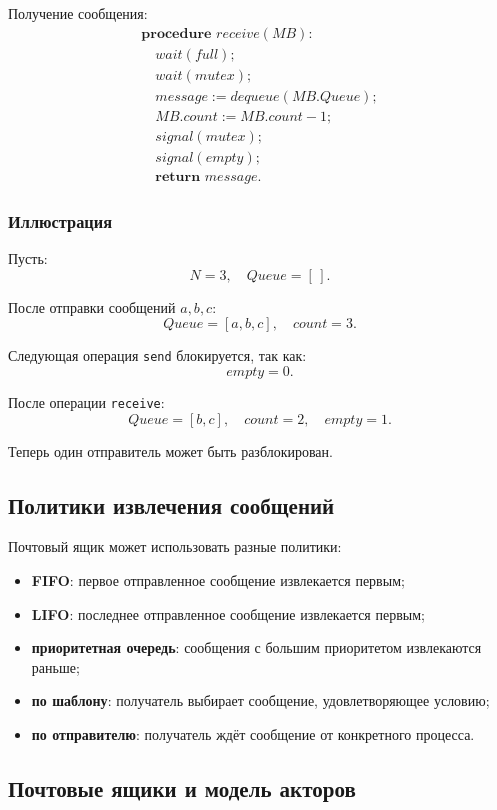 \documentclass[12pt,a4paper]{article}
\begin{document}
Получение сообщения:
\[
\begin{array}{l}
\textbf{procedure } receive(MB):\\
\quad wait(full);\\
\quad wait(mutex);\\
\quad message := dequeue(MB.Queue);\\
\quad MB.count := MB.count - 1;\\
\quad signal(mutex);\\
\quad signal(empty);\\
\quad \textbf{return } message.
\end{array}
\]

\subsubsection{Иллюстрация}

Пусть:
\[
N = 3,
\quad
Queue = [\,].
\]

После отправки сообщений $a,b,c$:
\[
Queue = [a,b,c],
\quad
count = 3.
\]

Следующая операция \texttt{send} блокируется, так как:
\[
empty = 0.
\]

После операции \texttt{receive}:
\[
Queue = [b,c],
\quad
count = 2,
\quad
empty = 1.
\]

Теперь один отправитель может быть разблокирован.

\subsection{Политики извлечения сообщений}

Почтовый ящик может использовать разные политики:
\begin{itemize}
    \item \textbf{FIFO}: первое отправленное сообщение извлекается первым;
    \item \textbf{LIFO}: последнее отправленное сообщение извлекается первым;
    \item \textbf{приоритетная очередь}: сообщения с большим приоритетом извлекаются раньше;
    \item \textbf{по шаблону}: получатель выбирает сообщение, удовлетворяющее условию;
    \item \textbf{по отправителю}: получатель ждёт сообщение от конкретного процесса.
\end{itemize}

\subsection{Почтовые ящики и модель акторов}
\end{document}
